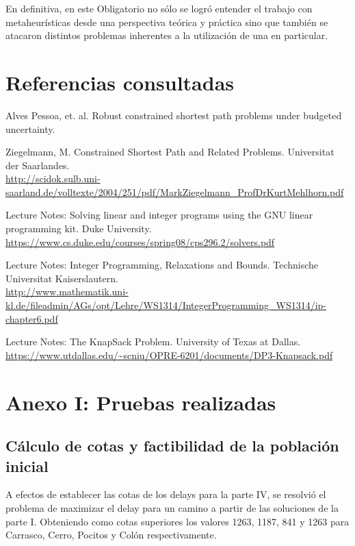 \documentclass{extarticle}
\begin{document}
En definitiva, en este Obligatorio no sólo se logró entender el trabajo con metaheurísticas desde una perspectiva teórica y práctica sino que también se atacaron distintos problemas inherentes a la utilización de una en particular.

\section{Referencias consultadas}
\begin{thebibliography}{99}		
	 Alves Pessoa, et. al. Robust constrained shortest path problems under budgeted uncertainty.
	
	 Ziegelmann, M. Constrained Shortest Path and Related Problems. Universitat der Saarlandes. \\
	\url{http://scidok.sulb.uni-saarland.de/volltexte/2004/251/pdf/MarkZiegelmann_ProfDrKurtMehlhorn.pdf}
	
	 Lecture Notes: Solving linear and integer programs using the GNU linear programming kit.  Duke University. \\ \url{https://www.cs.duke.edu/courses/spring08/cps296.2/solvers.pdf}
	
	 Lecture Notes: Integer Programming, Relaxations and Bounds. Technische Universitat Kaiserslautern. \\
	\url{http://www.mathematik.uni-kl.de/fileadmin/AGs/opt/Lehre/WS1314/IntegerProgramming_WS1314/ip-chapter6.pdf}
	
	 Lecture Notes: The KnapSack Problem. University of Texas at Dallas. \\
	\url{https://www.utdallas.edu/~scniu/OPRE-6201/documents/DP3-Knapsack.pdf}
	
\end{thebibliography}

\newpage
\section{Anexo I: Pruebas realizadas}
\subsection{Cálculo de cotas y factibilidad de la población inicial}

A efectos de establecer las cotas de los delays para la parte IV, se resolvió el problema de maximizar el delay para un camino a partir de las soluciones de la parte I. Obteniendo como cotas superiores los valores 1263, 1187, 841 y 1263 para Carrasco, Cerro, Pocitos y Colón respectivamente.
 
\end{document}
